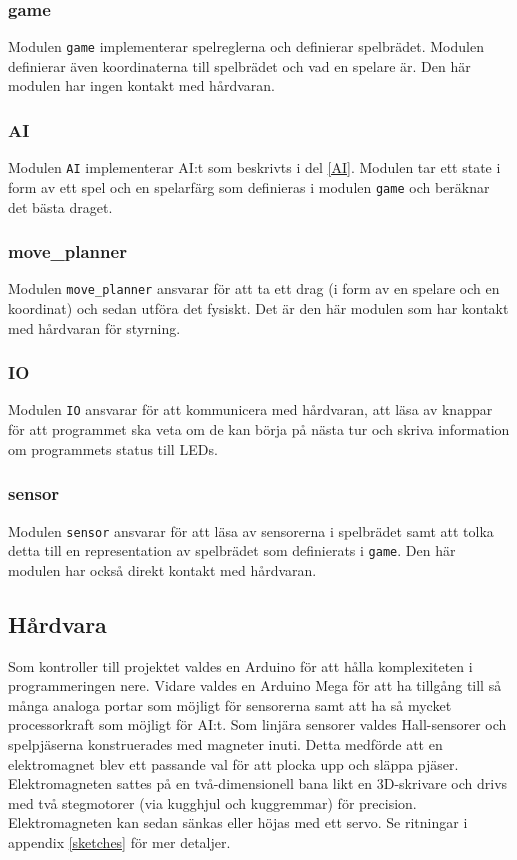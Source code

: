 \documentclass[a4paper]{article}
\begin{document}
\subsubsection*{game}
Modulen \texttt{game} implementerar spelreglerna och definierar spelbrädet.
Modulen definierar även koordinaterna till spelbrädet och vad en spelare är.
Den här modulen har ingen kontakt med hårdvaran.

\subsubsection*{AI}
Modulen \texttt{AI} implementerar AI:t som beskrivts i del \ref{AI}.
Modulen tar ett state i form av ett spel och en spelarfärg som definieras i modulen \texttt{game} och beräknar det bästa draget.

\subsubsection*{move\_planner}
Modulen \texttt{move\_planner} ansvarar för att ta ett drag (i form av en spelare och en koordinat) och sedan utföra det fysiskt.
Det är den här modulen som har kontakt med hårdvaran för styrning.

\subsubsection*{IO}
Modulen \texttt{IO} ansvarar för att kommunicera med hårdvaran, att läsa av knappar för att programmet ska veta om de kan börja på nästa tur och skriva information om programmets status till LEDs.

\subsubsection*{sensor}
Modulen \texttt{sensor} ansvarar för att läsa av sensorerna i spelbrädet samt att tolka detta till en representation av spelbrädet som definierats i \texttt{game}.
Den här modulen har också direkt kontakt med hårdvaran.

\subsection{Hårdvara}
Som kontroller till projektet valdes en Arduino för att hålla komplexiteten i programmeringen nere.
Vidare valdes en Arduino Mega för att ha tillgång till så många analoga portar som möjligt för sensorerna samt att ha så mycket processorkraft som möjligt för AI:t.
Som linjära sensorer valdes Hall-sensorer och spelpjäserna konstruerades med magneter inuti.
Detta medförde att en elektromagnet blev ett passande val för att plocka upp och släppa pjäser.
Elektromagneten sattes på en två-dimensionell bana likt en 3D-skrivare och drivs med två stegmotorer (via kugghjul och kuggremmar) för precision.
Elektromagneten kan sedan sänkas eller höjas med ett servo.
Se ritningar i appendix \ref{sketches} för mer detaljer.
\end{document}
